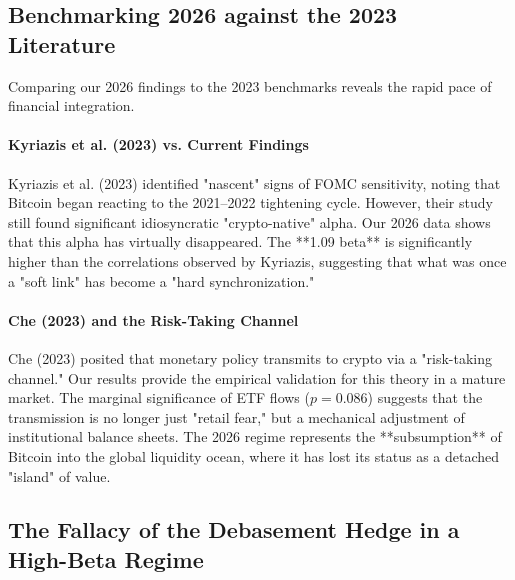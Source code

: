 \documentclass[10pt, conference, compsocconf]{IEEEtran}
\begin{document}

\subsection{Benchmarking 2026 against the 2023 Literature}

Comparing our 2026 findings to the 2023 benchmarks reveals the rapid pace of financial integration.

\paragraph{Kyriazis et al. (2023) vs. Current Findings}
Kyriazis et al. (2023) identified "nascent" signs of FOMC sensitivity, noting that Bitcoin began reacting to the 2021--2022 tightening cycle. However, their study still found significant idiosyncratic "crypto-native" alpha. Our 2026 data shows that this alpha has virtually disappeared. The **1.09 beta** is significantly higher than the correlations observed by Kyriazis, suggesting that what was once a "soft link" has become a "hard synchronization."

\paragraph{Che (2023) and the Risk-Taking Channel}
Che (2023) posited that monetary policy transmits to crypto via a "risk-taking channel." Our results provide the empirical validation for this theory in a mature market. The marginal significance of ETF flows ($p=0.086$) suggests that the transmission is no longer just "retail fear," but a mechanical adjustment of institutional balance sheets. The 2026 regime represents the **subsumption** of Bitcoin into the global liquidity ocean, where it has lost its status as a detached "island" of value.


\subsection{The Fallacy of the Debasement Hedge in a High-Beta Regime}
\end{document}
